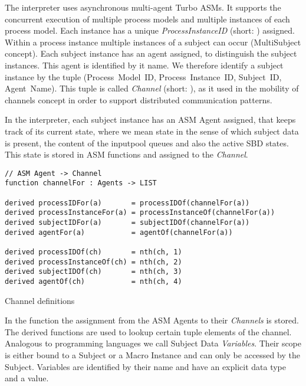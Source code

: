 The interpreter uses asynchronous multi-agent Turbo ASMs.
It supports the concurrent execution of multiple process models and multiple instances of each process model.
Each instance has a unique \textit{ProcessInstanceID} (short: ) assigned.
Within a process instance multiple instances of a subject can occur (MultiSubject concept).
Each subject instance has an agent assigned, to distinguish the subject instances.
This agent is identified by it name.
We therefore identify a subject instance by the tuple (Process~Model~ID, Process~Instance~ID, Subject~ID, Agent~Name).
This tuple is called \textit{Channel} (short: ), as it used in the mobility of channels concept in order to support distributed communication patterns.

In the interpreter, each subject instance has an ASM Agent assigned, that keeps track of its current state,
where we mean state in the sense of which subject data is present, the content of the inputpool queues and also the active SBD states.
This state is stored in ASM functions and assigned to the \textit{Channel}.

\begin{listing}[H]
\begin{verbatim}
// ASM Agent -> Channel
function channelFor : Agents -> LIST

derived processIDFor(a)       = processIDOf(channelFor(a))
derived processInstanceFor(a) = processInstanceOf(channelFor(a))
derived subjectIDFor(a)       = subjectIDOf(channelFor(a))
derived agentFor(a)           = agentOf(channelFor(a))

derived processIDOf(ch)       = nth(ch, 1)
derived processInstanceOf(ch) = nth(ch, 2)
derived subjectIDOf(ch)       = nth(ch, 3)
derived agentOf(ch)           = nth(ch, 4)
\end{verbatim}
\caption{Channel definitions}
\label{lst:shortasm:channelFor}
\end{listing}

In the function  the assignment from the ASM Agents to their \textit{Channels} is stored.
The derived functions are used to lookup certain tuple elements of the channel.\\



Analogous to programming languages we call Subject Data \textit{Variables}.
Their scope is either bound to a Subject or a Macro Instance and can only be
accessed by the Subject. Variables are identified by their name and have an
explicit data type and a value.

